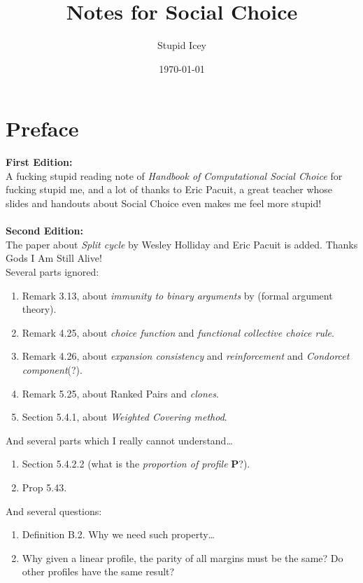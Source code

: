 \documentclass[a4paper,12pt,oneside]{book}
\title{Notes for Social Choice}
\author{Stupid Icey}
\date{\today}
\newcommand{\profile}{\mathbf{P}}
\begin{document}
\maketitle


\chapter*{Preface}

\textbf{First Edition:}\\
A fucking stupid reading note of \textit{Handbook of Computational Social Choice} \parencite{Moulin2016} for fucking stupid me, and a lot of thanks to Eric Pacuit, a great teacher whose slides and handouts about Social Choice even makes me feel more stupid!\\
~\\
\noindent \textbf{Second Edition:}\\
The paper about \emph{Split cycle} by Wesley Holliday and Eric Pacuit \parencite{Holliday2020} is added. Thanks Gods I Am Still Alive!\\
Several parts ignored:
\begin{enumerate}
  \item Remark 3.13, about \emph{immunity to binary arguments} by \textcite{Heitzig2002} (formal argument theory).
  \item Remark 4.25, about \emph{choice function} and \emph{functional collective choice rule}.
  \item Remark 4.26, about \emph{expansion consistency} and \emph{reinforcement} and \emph{Condorcet component}(?).
  \item Remark 5.25, about Ranked Pairs and \emph{clones}.
  \item Section 5.4.1, about \emph{Weighted Covering method}.
\end{enumerate}

\noindent And several parts which I really cannot understand\dots
\begin{enumerate}
  \item Section 5.4.2.2 (what is the \emph{proportion of profile} $\profile$?).
  \item Prop 5.43.
\end{enumerate}

\noindent And several questions:
\begin{enumerate}
  \item Definition B.2. Why we need such property\dots
  \item Why given a linear profile, the parity of all margins must be the same? Do other profiles have the same result?
\end{enumerate}
\end{document}
